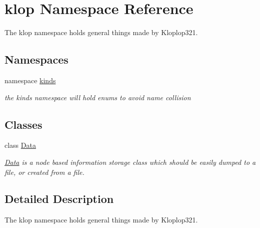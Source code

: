 \hypertarget{namespaceklop}{
\section{klop Namespace Reference}
\label{namespaceklop}
}


The klop namespace holds general things made by Kloplop321.  


\subsection*{Namespaces}
\begin{DoxyCompactItemize}
\item 
namespace \hyperlink{namespaceklop_1_1kinds}{kinds}


\begin{DoxyCompactList}\small\item\em the kinds namespace will hold enums to avoid name collision \item\end{DoxyCompactList}

\end{DoxyCompactItemize}
\subsection*{Classes}
\begin{DoxyCompactItemize}
\item 
class \hyperlink{classklop_1_1Data}{Data}
\begin{DoxyCompactList}\small\item\em \hyperlink{classklop_1_1Data}{Data} is a node based information storage class which should be easily dumped to a file, or created from a file. \item\end{DoxyCompactList}\end{DoxyCompactItemize}


\subsection{Detailed Description}
The klop namespace holds general things made by Kloplop321. 